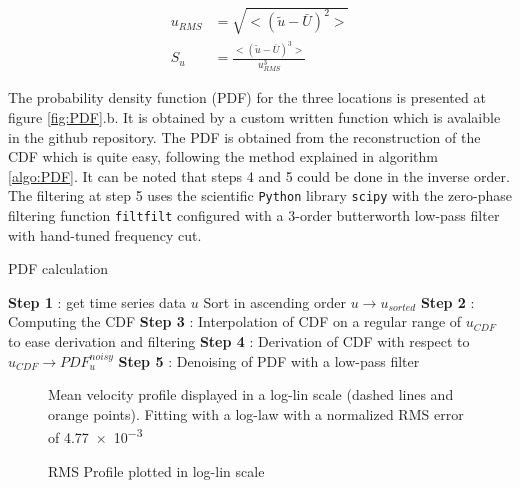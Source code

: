 \documentclass[12pt]{article}
\begin{document}
\begin{align}
    u_{RMS} &= \sqrt{<\left(\tilde{u}-\bar{U}\right)^2>} \\
    S_u &= \frac{<\left(\tilde{u}-\bar{U}\right)^3>}{u_{RMS}^3}
\end{align}

The probability density function (PDF) for the three locations is presented at figure \ref{fig:PDF}.b. It is obtained by a custom written function which is avalaible in the github repository. The PDF is obtained from the reconstruction of the CDF which is quite easy, following the method explained in algorithm \ref{algo:PDF}. It can be noted that steps 4 and 5 could be done in the inverse order. The filtering at step 5 uses the scientific \verb|Python| library \verb|scipy| with the zero-phase filtering function \verb|filtfilt| configured with a 3-order butterworth low-pass filter with hand-tuned frequency cut.\\

\begin{algorithm}
\label{algo:PDF}
\caption{PDF calculation}
\SetAlgoLined
{}
\textbf{Step 1} : get time series data $u$\;
Sort in ascending order $u \rightarrow u_{sorted}$\;
\textbf{Step 2} : Computing the CDF\;
\textbf{Step 3} : Interpolation of CDF on a regular range of $u_{CDF}$ to ease derivation and filtering\;
\textbf{Step 4} : Derivation of CDF with respect to $u_{CDF} \rightarrow  PDF_u^{noisy}$\;
\textbf{Step 5} : Denoising of PDF with a low-pass filter\;
\end{algorithm}


\begin{figure}
    \centering
        \resizebox{0.6\linewidth}{!}{}
    \caption{Mean velocity profile displayed in a log-lin scale (dashed lines and orange points). Fitting with a log-law with a normalized RMS error of \num{4.77e-3}}
    \label{fig:Mean_Velocity_Profile}
\end{figure}

\begin{figure}
    \centering
        \resizebox{0.6\linewidth}{!}{}
    \caption{RMS Profile plotted in log-lin scale}
    \label{fig:RMS_Profile}
\end{figure}
\end{document}
